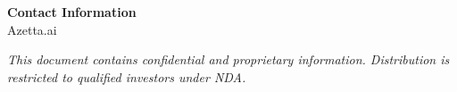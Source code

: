 \noindent\textbf{Contact Information}\\
Azetta.ai\\

\vspace{0.5cm}

\noindent\textit{This document contains confidential and proprietary information. Distribution is restricted to qualified investors under NDA.}
